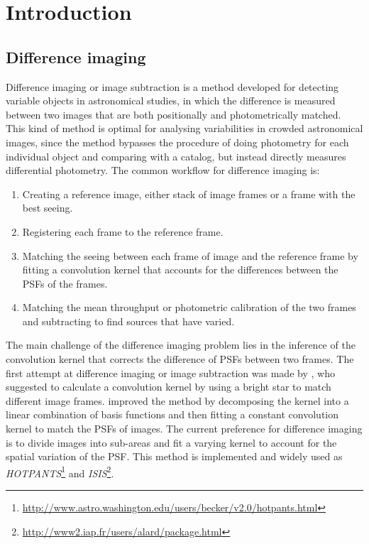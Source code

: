 \documentclass[12pt, preprint]{aastex}
\newcommand{\project}[1]{\textsl{#1}}
\begin{document}
\section{Introduction}

\subsection{Difference imaging}
Difference imaging or image subtraction is a method developed for detecting variable objects in astronomical studies, in which the difference is measured between two images that are both positionally and photometrically matched. This kind of method is optimal for analysing variabilities in crowded astronomical images, since the method bypasses the procedure of doing photometry for each individual object and comparing with a catalog, but instead directly measures differential photometry.
The common workflow for difference imaging is:
\begin{enumerate}
\item
Creating a reference image, either stack of image frames or a frame with the best seeing.
\item
Registering each frame to the reference frame.
\item
Matching the seeing between each frame of image and the reference frame by fitting a convolution kernel that accounts for the differences between the PSFs of the frames.
\item
Matching the mean throughput or photometric calibration of the two frames and subtracting to find sources that have varied.
\end{enumerate}
The main challenge of the difference imaging problem lies in the inference of the convolution kernel that corrects the difference of PSFs between two frames.
The first attempt at difference imaging or image subtraction was made by \cite{imagesub1}, who suggested to calculate a convolution kernel by using a bright star to match different image frames. 
\cite{alard} improved the method by decomposing the kernel into a linear combination of basis functions and then fitting a constant convolution kernel to match the PSFs of images.
The current preference for difference imaging \citep{varyingkernel} is to divide images into sub-areas and fit a varying kernel to account for the spatial variation of the PSF. This method is implemented and widely used as \project{HOTPANTS}\footnote{\url{http://www.astro.washington.edu/users/becker/v2.0/hotpants.html}} and \project{ISIS}\footnote{\url{http://www2.iap.fr/users/alard/package.html}}. 
\end{document}
